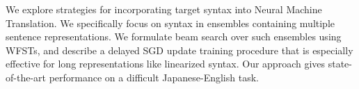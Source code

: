 We explore strategies for incorporating target syntax into Neural Machine Translation. We specifically focus on syntax in ensembles containing multiple sentence representations. We formulate beam search over such ensembles using WFSTs, and describe a delayed SGD update training procedure that is especially effective for long representations like linearized syntax. Our approach gives state-of-the-art performance on a difficult Japanese-English task.

